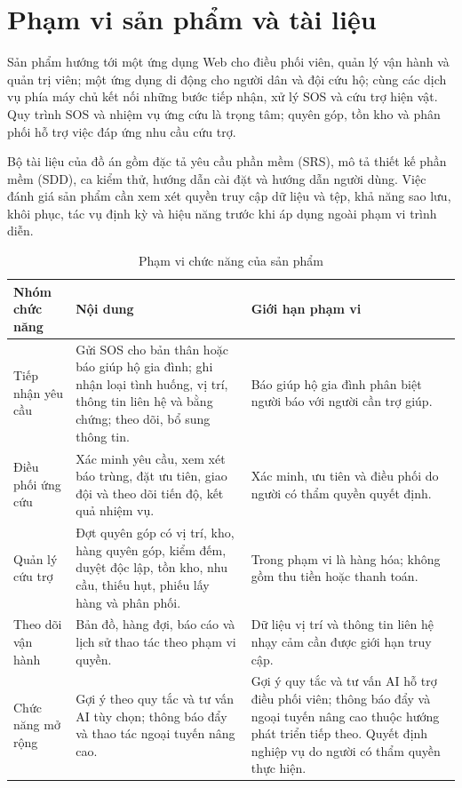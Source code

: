 \documentclass[12pt,a4paper,oneside]{report}
\begin{document}
\section{Phạm vi sản phẩm và tài liệu}
Sản phẩm hướng tới một ứng dụng Web cho điều phối viên, quản lý vận hành và quản trị viên; một ứng dụng di động cho người dân và đội cứu hộ; cùng các dịch vụ phía máy chủ kết nối những bước tiếp nhận, xử lý SOS và cứu trợ hiện vật. Quy trình SOS và nhiệm vụ ứng cứu là trọng tâm; quyên góp, tồn kho và phân phối hỗ trợ việc đáp ứng nhu cầu cứu trợ.

Bộ tài liệu của đồ án gồm đặc tả yêu cầu phần mềm (SRS), mô tả thiết kế phần mềm (SDD), ca kiểm thử, hướng dẫn cài đặt và hướng dẫn người dùng. Việc đánh giá sản phẩm cần xem xét quyền truy cập dữ liệu và tệp, khả năng sao lưu, khôi phục, tác vụ định kỳ và hiệu năng trước khi áp dụng ngoài phạm vi trình diễn.

\begin{table}[htbp]
  \centering
  \caption{Phạm vi chức năng của sản phẩm}\label{tab:scope-priority}
  \small
  \begin{tabularx}{\textwidth}{|L{3.0cm}|Y|L{4.0cm}|}
    \hline
    \centering\textbf{Nhóm chức năng} & \centering\textbf{Nội dung} & \centering\arraybackslash\textbf{Giới hạn phạm vi} \\
    \hline
    Tiếp nhận yêu cầu & Gửi SOS cho bản thân hoặc báo giúp hộ gia đình; ghi nhận loại tình huống, vị trí, thông tin liên hệ và bằng chứng; theo dõi, bổ sung thông tin. & Báo giúp hộ gia đình phân biệt người báo với người cần trợ giúp. \\
    \hline
    Điều phối ứng cứu & Xác minh yêu cầu, xem xét báo trùng, đặt ưu tiên, giao đội và theo dõi tiến độ, kết quả nhiệm vụ. & Xác minh, ưu tiên và điều phối do người có thẩm quyền quyết định. \\
    \hline
    Quản lý cứu trợ & Đợt quyên góp có vị trí, kho, hàng quyên góp, kiểm đếm, duyệt độc lập, tồn kho, nhu cầu, thiếu hụt, phiếu lấy hàng và phân phối. & Trong phạm vi là hàng hóa; không gồm thu tiền hoặc thanh toán. \\
    \hline
    Theo dõi vận hành & Bản đồ, hàng đợi, báo cáo và lịch sử thao tác theo phạm vi quyền. & Dữ liệu vị trí và thông tin liên hệ nhạy cảm cần được giới hạn truy cập. \\
    \hline
    Chức năng mở rộng & Gợi ý theo quy tắc và tư vấn AI tùy chọn; thông báo đẩy và thao tác ngoại tuyến nâng cao. & Gợi ý quy tắc và tư vấn AI hỗ trợ điều phối viên; thông báo đẩy và ngoại tuyến nâng cao thuộc hướng phát triển tiếp theo. Quyết định nghiệp vụ do người có thẩm quyền thực hiện. \\
    \hline
  \end{tabularx}
\end{table}
\end{document}
